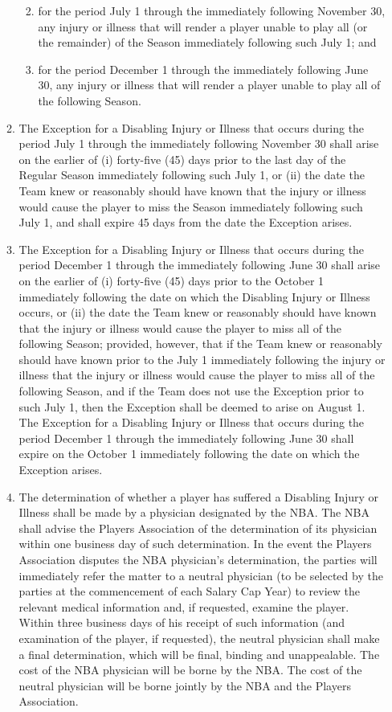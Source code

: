 \documentclass[
]{book}
\providecommand{\tightlist}{%
  \setlength{\itemsep}{0pt}\setlength{\parskip}{0pt}}
\begin{document}
\begin{enumerate}
\begin{enumerate}
    \begin{enumerate}
    \def\labelenumiii{(\roman{enumiii})}
    \tightlist
    \item
      for the period July 1 through the immediately following November 30, any injury or illness that will render a player unable to play all (or the remainder) of the Season immediately following such July 1; and
    \item
      for the period December 1 through the immediately following June 30, any injury or illness that will render a player unable to play all of the following Season.
    \end{enumerate}
  \item
    The Exception for a Disabling Injury or Illness that occurs during the period July 1 through the immediately following November 30 shall arise on the earlier of (i) forty-five (45) days prior to the last day of the Regular Season immediately following such July 1, or (ii) the date the Team knew or reasonably should have known that the injury or illness would cause the player to miss the Season immediately following such July 1, and shall expire 45 days from the date the Exception arises.
  \item
    The Exception for a Disabling Injury or Illness that occurs during the period December 1 through the immediately following June 30 shall arise on the earlier of (i) forty-five (45) days prior to the October 1 immediately following the date on which the Disabling Injury or Illness occurs, or (ii) the date the Team knew or reasonably should have known that the injury or illness would cause the player to miss all of the following Season; provided, however, that if the Team knew or reasonably should have known prior to the July 1 immediately following the injury or illness that the injury or illness would cause the player to miss all of the following Season, and if the Team does not use the Exception prior to such July 1, then the Exception shall be deemed to arise on August 1. The Exception for a Disabling Injury or Illness that occurs during the period December 1 through the immediately following June 30 shall expire on the October 1 immediately following the date on which the Exception arises.
  \item
    The determination of whether a player has suffered a Disabling Injury or Illness shall be made by a physician designated by the NBA. The NBA shall advise the Players Association of the determination of its physician within one business day of such determination. In the event the Players Association disputes the NBA physician's determination, the parties will immediately refer the matter to a neutral physician (to be selected by the parties at the commencement of each Salary Cap Year) to review the relevant medical information and, if requested, examine the player. Within three business days of his receipt of such information (and examination of the player, if requested), the neutral physician shall make a final determination, which will be final, binding and unappealable. The cost of the NBA physician will be borne by the NBA. The cost of the neutral physician will be borne jointly by the NBA and the Players Association.

\end{enumerate}
\end{enumerate}
\end{document}
